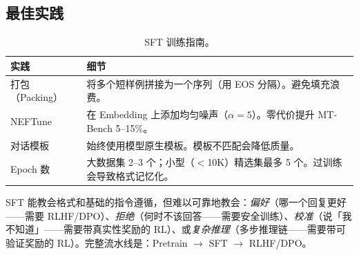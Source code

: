 \subsection{最佳实践}
\label{best-practices}

\begin{table}[ht!]
\centering\small
\caption{SFT 训练指南。}
\noindent\begin{tabularx}{\linewidth}{@{}l Z{1}@{}}
\toprule
\textbf{实践} & \textbf{细节} \\
\midrule
打包（Packing） & 将多个短样例拼接为一个序列（用 EOS 分隔）。避免填充浪费。 \\
NEFTune~\cite{jain2024neftune} & 在 Embedding 上添加均匀噪声（$\alpha=5$）。零代价提升 MT-Bench 5--15\%。 \\
对话模板 & 始终使用模型原生模板。模板不匹配会降低质量。 \\
Epoch 数 & 大数据集 2--3 个；小型（$<$10K）精选集最多 5 个。过训练会导致格式记忆化。 \\
\bottomrule
\end{tabularx}
\end{table}

\begin{intuitionbox}
SFT 能教会格式和基础的指令遵循，但难以可靠地教会：\emph{偏好}（哪一个回复更好——需要 RLHF/DPO）、\emph{拒绝}（何时不该回答——需要安全训练）、\emph{校准}（说「我不知道」——需要带真实性奖励的 RL）、或\emph{复杂推理}（多步推理链——需要带可验证奖励的 RL）。完整流水线是：Pretrain $\to$ SFT $\to$ RLHF/DPO。
\end{intuitionbox}

